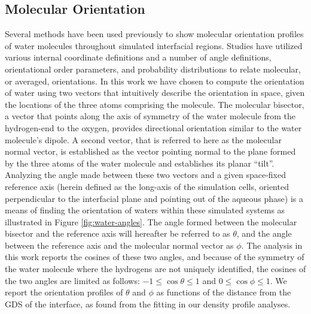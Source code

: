 
\subsection{Molecular Orientation}
Several methods have been used previously to show molecular orientation profiles of water molecules throughout simulated interfacial regions.\cite{Wick2006c,Thomas2007,Wick2008a,Wick2007,Fan2009,Galamba2008,Ishiyama2007,Hore2007,Hore2008} Studies have utilized various internal coordinate definitions and a number of angle definitions, orientational order parameters, and probability distributions to relate molecular, or averaged, orientations. In this work we have chosen to compute the orientation of water using two vectors that intuitively describe the orientation in space, given the locations of the three atoms comprising the molecule. The molecular bisector, a vector that points along the axis of symmetry of the water molecule from the hydrogen-end to the oxygen, provides directional orientation similar to the water molecule's dipole. A second vector, that is referred to here as the molecular normal vector, is established as the vector pointing normal to the plane formed by the three atoms of the water molecule and establishes its planar ``tilt''. Analyzing the angle made between these two vectors and a given space-fixed reference axis (herein defined as the long-axis of the simulation cells, oriented perpendicular to the interfacial plane and pointing out of the aqueous phase) is a means of finding the orientation of waters within these simulated systems as illustrated in Figure \ref{fig:water-angles}. The angle formed between the molecular bisector and the reference axis will hereafter be referred to as $\theta$, and the angle between the reference axis and the molecular normal vector as $\phi$. The analysis in this work reports the cosines of these two angles, and because of the symmetry of the water molecule where the hydrogens are not uniquely identified, the cosines of the two angles are limited as follows: $-1\le\cos\theta\le1$ and $0\le\cos\phi\le1$. We report the orientation profiles of $\theta$ and $\phi$ as functions of the distance from the GDS of the interface, as found from the fitting in our density profile analyses.

